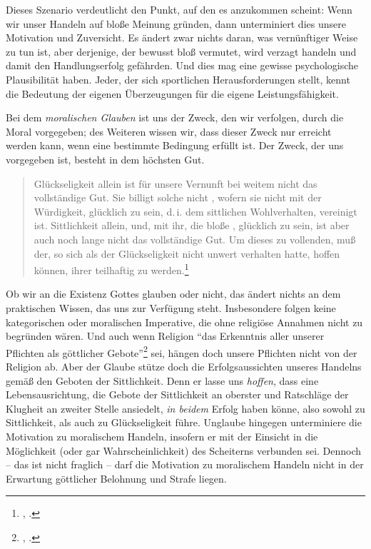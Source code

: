 \begin{nummerierung}
Dieses Szenario verdeutlicht den Punkt, auf den es 
anzukommen scheint: Wenn wir unser Handeln auf bloße Meinung gründen, dann
unterminiert dies unsere Motivation und Zuversicht. Es ändert zwar nichts daran,
was vernünftiger Weise zu tun ist, aber derjenige, der bewusst bloß vermutet,
wird verzagt handeln und damit den Handlungserfolg gefährden. Und dies mag eine
gewisse psychologische Plausibilität haben. Jeder, der sich sportlichen
Herausforderungen stellt, kennt die Bedeutung der eigenen Überzeugungen für die
eigene Leistungsfähigkeit.
%
\item\label{MoralischerGlaube} Bei dem \emph{moralischen Glauben} ist uns der
Zweck, den wir verfolgen, durch die Moral vorgegeben; des Weiteren wissen wir,
dass dieser Zweck nur erreicht werden kann, wenn eine bestimmte Bedingung
erfüllt ist. Der Zweck, der uns vorgegeben ist, besteht in dem höchsten Gut.
\begin{quote}
Glückseligkeit allein ist für unsere Vernunft bei weitem nicht das vollständige
Gut. Sie billigt solche nicht {\punkt}, wofern sie nicht mit der Würdigkeit,
glücklich zu sein, d.\,i. dem sittlichen Wohlverhalten, vereinigt ist.
Sittlichkeit allein, und, mit ihr, die bloße , glücklich zu
sein, ist aber auch noch lange nicht das vollständige Gut. Um dieses zu
vollenden, muß der, so sich als der Glückseligkeit nicht unwert verhalten hatte,
hoffen können, ihrer teilhaftig zu
werden.\footnote{\cite[][B 841]{Kant:KritikderreinenVernunft2003},
\cite[][III: 527.33--528.3]{Kant:GesammelteWerke1900ff.}.}
\end{quote}
Ob wir an die Existenz Gottes glauben oder nicht, das ändert nichts an dem
praktischen Wissen, das uns zur Verfügung steht. Insbesondere folgen keine
kategorischen oder moralischen Imperative, die ohne religiöse
Annahmen nicht zu begründen wären.
Und auch wenn Religion \enquote{das Erkenntnis aller unserer Pflichten als göttlicher
Gebote}\footnote{\cite[][B~229]{Kant:DieReligioninnerhalbderGrenzenderblossenVernunft1977}, \cite[][VI:
153.28--29]{Kant:GesammelteWerke1900ff.}.} sei, hängen doch unsere Pflichten
nicht von der Religion ab. Aber der Glaube stütze doch die Erfolgsaussichten
unseres Handelns gemäß den Geboten der Sittlichkeit. Denn er lasse uns
\emph{hoffen}, dass eine Lebensausrichtung, die Gebote der Sittlichkeit an
oberster und Ratschläge der Klugheit an zweiter Stelle ansiedelt, \emph{in
beidem} Erfolg haben könne, also sowohl zu Sittlichkeit, als auch zu
Glückseligkeit führe. Unglaube hingegen unterminiere die Motivation zu
moralischem Handeln, insofern er mit der Einsicht in die Möglichkeit (oder gar
Wahrscheinlichkeit) des Scheiterns verbunden sei. Dennoch -- das ist nicht
fraglich -- darf die Motivation zu moralischem Handeln nicht in der Erwartung
göttlicher Belohnung und Strafe liegen.
%


\end{nummerierung}
